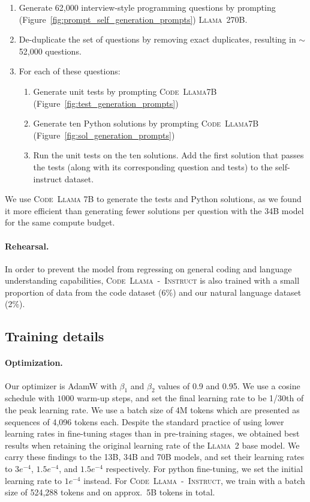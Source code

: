 \begin{enumerate}
 \item Generate 62,000 interview-style programming questions by prompting (Figure~\ref{fig:prompt_self_generation_prompts}) \textsc{Llama~2}70B.
 \item De-duplicate the set of questions by removing exact duplicates, resulting in $\sim$52,000 questions.
 \item For each of these questions:
 \begin{enumerate}
    \item Generate unit tests by prompting \textsc{Code~Llama}7B (Figure~\ref{fig:test_generation_prompts})
    \item Generate ten Python solutions by prompting \textsc{Code~Llama}7B (Figure~\ref{fig:sol_generation_prompts})
    \item Run the unit tests on the ten solutions. Add the first solution that passes the tests (along with its corresponding question and tests) to the self-instruct dataset.
 \end{enumerate}
\end{enumerate}

We use \textsc{Code~Llama} 7B to generate the tests and Python solutions, as we found it more efficient than generating fewer solutions per question with the 34B model for the same compute budget. 

\paragraph{Rehearsal.}
In order to prevent the model from regressing on general coding and language understanding capabilities, \textsc{Code~Llama~-~Instruct} is also trained with a small proportion of data from the code dataset (6\%) and our natural language dataset (2\%). 

\subsection{Training details}

\paragraph{Optimization.}
Our optimizer is AdamW \citep{loshchilov2019decoupled} with $\beta_1$ and $\beta_2$ values of 0.9 and 0.95. We use a cosine schedule with $1000$ warm-up steps, and set the final learning rate to be 1/30th of the peak learning rate. We use a batch size of 4M tokens which are presented as sequences of 4,096 tokens each. Despite the standard practice of using lower learning rates in fine-tuning stages than in pre-training stages, we obtained best results when retaining the original learning rate of the \textsc{Llama~2} base model. We carry these findings to the 13B, 34B and 70B models, and set their learning rates to $3e^{-4}$, $1.5e^{-4}$, and  $1.5e^{-4}$ respectively. For python fine-tuning, we set the initial learning rate to $1e^{-4}$ instead. For \textsc{Code~Llama~-~Instruct}, we train with a batch size of 524,288 tokens and on approx.\ 5B tokens in total. 

